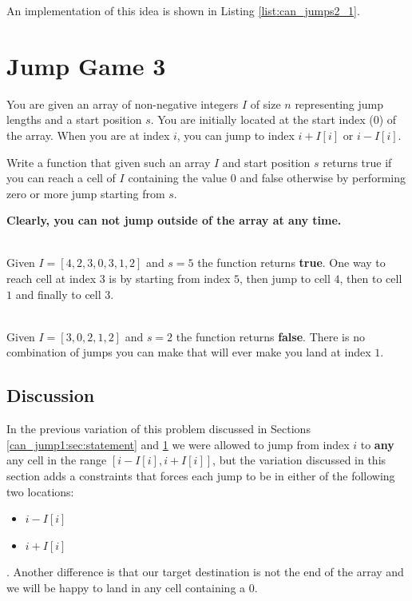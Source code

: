 An implementation of this idea is shown in Listing \ref{list:can_jumps2_1}.





\section{Jump Game 3}
\label{can_jump3:sec:statement}
\begin{exercise}
    You are given an array of non-negative integers $I$ of size $n$ representing jump lengths and a start position $s$.
    You are initially located at the start index ($0$) of the array. 
    When you are at index $i$, you can jump to index $i + I[i]$ or $i - I[i]$.

    Write a function that given such an array $I$ and start position $s$ returns true if you can reach a cell of $I$ containing the value $0$ and false otherwise by performing 
    zero or more jump starting from $s$.
            
    \textbf{Clearly, you can not jump outside of the array at any time.}
    
    \begin{example}
        \hfill \\
        Given  $I=[4,2,3,0,3,1,2]$ and $s=5$ the function returns \textbf{true}.
        One way to reach cell at index $3$ is by starting from index $5$, then jump to cell $4$, then to cell $1$ and finally to cell $3$.
        \label{ex:can_jump3_example1}
    \end{example}

    \begin{example}
        \hfill \\
        Given  $I=[3,0,2,1,2]$ and $s=2$ the function returns \textbf{false}.
        There is no combination of jumps you can make that will ever make you land at index $1$.
        \label{ex:can_jump3_example2}
    \end{example}
\end{exercise}

\subsection{Discussion}
In the previous variation of this problem discussed in Sections \ref{can_jump1:sec:statement} and \ref{can_jump3:sec:statement} we were allowed to jump from index $i$ to \textbf{any} any cell in the range $[i-I[i],i+I[i]]$, but the variation discussed in this section adds a constraints that forces each jump to be in either of the following two locations:
\begin{itemize}
    \item $i-I[i]$
    \item $i+I[i]$
\end{itemize}.
Another difference is that our target destination is not the end of the array and we will be happy to land in any cell containing a $0$.

